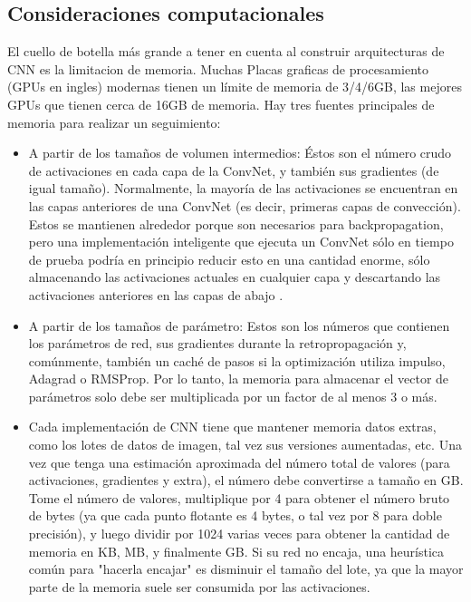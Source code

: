 \documentclass[a4paper,11pt,spanish]{book}
\begin{document}
    \subsection {Consideraciones computacionales}
      El cuello de botella más grande a tener en cuenta al construir arquitecturas de CNN es la limitacion de memoria. 
      Muchas Placas graficas de procesamiento (GPUs en ingles) modernas tienen un límite de memoria de 3/4/6GB, las mejores GPUs que tienen cerca de 16GB de memoria. 
      Hay tres fuentes principales de memoria para realizar un seguimiento:
      \begin{itemize}
	\item A partir de los tamaños de volumen intermedios: Éstos son el número crudo de activaciones en cada capa de la ConvNet, y también sus gradientes (de igual tamaño). Normalmente, la mayoría de las activaciones se encuentran en las capas anteriores de una ConvNet (es decir, primeras capas de convección). Estos se mantienen alrededor porque son necesarios para backpropagation, pero una implementación inteligente que ejecuta un ConvNet sólo en tiempo de prueba podría en principio reducir esto en una cantidad enorme, sólo almacenando las activaciones actuales en cualquier capa y descartando las activaciones anteriores en las capas de abajo .
	\item A partir de los tamaños de parámetro: Estos son los números que contienen los parámetros de red, sus gradientes durante la retropropagación y, comúnmente, también un caché de pasos si la optimización utiliza impulso, Adagrad o RMSProp. Por lo tanto, la memoria para almacenar el vector de parámetros solo debe ser multiplicada por un factor de al menos 3 o más.
	\item Cada implementación de CNN tiene que mantener memoria datos extras, como los lotes de datos de imagen, tal vez sus versiones aumentadas, etc.
	Una vez que tenga una estimación aproximada del número total de valores (para activaciones, gradientes y extra), el número debe convertirse a tamaño en GB. Tome el número de valores, multiplique por 4 para obtener el número bruto de bytes (ya que cada punto flotante es 4 bytes, o tal vez por 8 para doble precisión), y luego dividir por 1024 varias veces para obtener la cantidad de memoria en KB, MB, y finalmente GB. Si su red no encaja, una heurística común para "hacerla encajar" es disminuir el tamaño del lote, ya que la mayor parte de la memoria suele ser consumida por las activaciones.
      \end{itemize}
\end{document}
